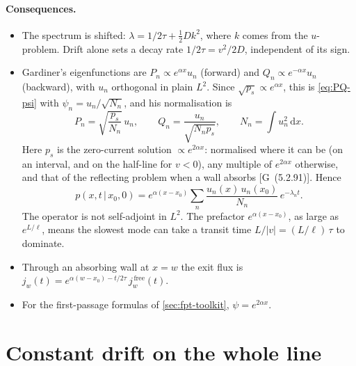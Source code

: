\documentclass[11pt]{article}
\numberwithin{equation}{section}
\newcommand{\dd}{\mathrm{d}}
\newcommand{\given}{\,|\,}
\newcommand{\G}[1]{[G~(#1)]}
\begin{document}
\paragraph{Consequences.}
\begin{itemize}
  \item The spectrum is shifted: $\lambda=1/2\tau+\tfrac12Dk^2$, where $k$ comes from the $u$-problem.
        Drift alone sets a decay rate $1/2\tau=v^2/2D$, independent of its sign.
  \item Gardiner's eigenfunctions are $P_n\propto e^{\alpha x}u_n$ (forward) and $Q_n\propto e^{-\alpha x}u_n$
        (backward), with $u_n$ orthogonal in plain $L^2$. Since $\sqrt{p_s}\propto e^{\alpha x}$, this is
        \cref{eq:PQ-psi} with $\psi_n=u_n/\sqrt{N_n}$, and his normalisation is
        \begin{equation}
          P_n=\sqrt{\frac{p_s}{N_n}}\,u_n,\qquad Q_n=\frac{u_n}{\sqrt{N_np_s}},\qquad N_n=\int u_n^2\,\dd x .
          \label{eq:drift-PQ}
        \end{equation}
        Here $p_s$ is the zero-current solution $\propto e^{2\alpha x}$: normalised where it can be (on an
        interval, and on the half-line for $v<0$), any multiple of $e^{2\alpha x}$ otherwise, and that of the
        reflecting problem when a wall absorbs \G{5.2.91}. Hence
        \begin{equation}
          p(x,t\given x_0,0)=e^{\alpha(x-x_0)}\sum_n\frac{u_n(x)\,u_n(x_0)}{N_n}\,e^{-\lambda_nt}.
          \label{eq:gauge-modes}
        \end{equation}
        The operator is not self-adjoint in $L^2$. The prefactor $e^{\alpha(x-x_0)}$, as large as $e^{L/\ell}$,
        means the slowest mode can take a transit time $L/|v|=(L/\ell)\,\tau$ to dominate.
  \item Through an absorbing wall at $x=w$ the exit flux is
        $j_w(t)=e^{\alpha(w-x_0)-t/2\tau}\,j_w^{\,\text{free}}(t)$.
  \item For the first-passage formulas of \cref{sec:fpt-toolkit}, $\psi=e^{2\alpha x}$.
\end{itemize}

\section{Constant drift on the whole line}
\label{sec:drift-line}
\end{document}
